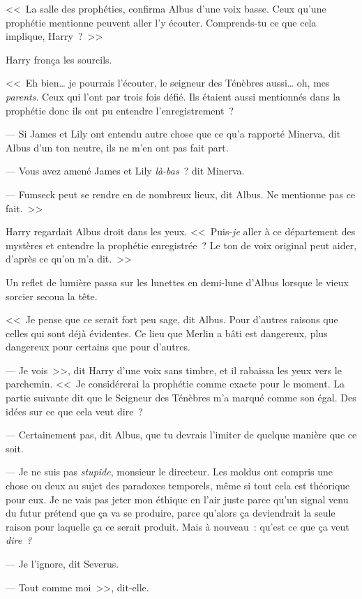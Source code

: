 <<~La salle des prophéties, confirma Albus d'une voix basse. Ceux qu'une prophétie mentionne peuvent aller l'y écouter. Comprends-tu ce que cela implique, Harry~?~>>

Harry fronça les sourcils.

<<~Eh bien… je pourrais l'écouter, le seigneur des Ténèbres aussi… oh, mes \emph{parents}. Ceux qui l'ont par trois fois défié. Ils étaient aussi mentionnés dans la prophétie donc ils ont pu entendre l'enregistrement~?

--- Si James et Lily ont entendu autre chose que ce qu'a rapporté Minerva, dit Albus d'un ton neutre, ils ne m'en ont pas fait part.

--- Vous avez amené James et Lily \emph{là-bas}~? dit Minerva.

--- Fumseck peut se rendre en de nombreux lieux, dit Albus. Ne mentionne pas ce fait.~>>

Harry regardait Albus droit dans les yeux. <<~Puis-\emph{je} aller à ce département des mystères et entendre la prophétie enregistrée~? Le ton de voix original peut aider, d'après ce qu'on m'a dit.~>>

Un reflet de lumière passa sur les lunettes en demi-lune d'Albus lorsque le vieux sorcier secoua la tête.

<<~Je pense que ce serait fort peu sage, dit Albus. Pour d'autres raisons que celles qui sont déjà évidentes. Ce lieu que Merlin a bâti est dangereux, plus dangereux pour certains que pour d'autres.

--- Je vois~>>, dit Harry d'une voix sans timbre, et il rabaissa les yeux vers le parchemin. <<~Je considérerai la prophétie comme exacte pour le moment. La partie suivante dit que le Seigneur des Ténèbres m'a marqué comme son égal. Des idées sur ce que cela veut dire~?

--- Certainement pas, dit Albus, que tu devrais l'imiter de quelque manière que ce soit.

--- Je ne suis pas \emph{stupide}, monsieur le directeur. Les moldus ont compris une chose ou deux au sujet des paradoxes temporels, même si tout cela est théorique pour eux. Je ne vais pas jeter mon éthique en l'air juste parce qu'un signal venu du futur prétend que ça va se produire, parce qu'alors ça deviendrait la seule raison pour laquelle ça ce serait produit. Mais à nouveau~: qu'est ce que ça veut \emph{dire~?}

--- Je l'ignore, dit Severus.

--- Tout comme moi~>>, dit-elle.

